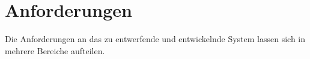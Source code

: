 \section{Anforderungen}
\label{sec:Anforderungen}

Die Anforderungen an das zu entwerfende und entwickelnde System lassen sich in mehrere Bereiche aufteilen.

%
%
%
%
%

